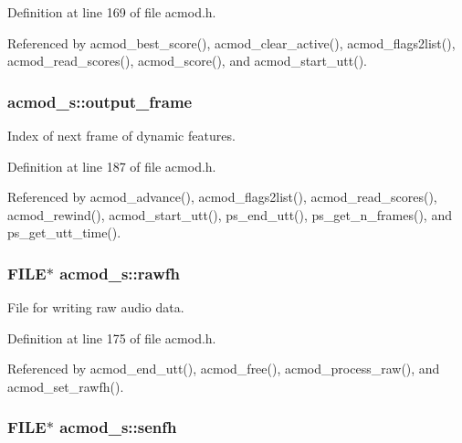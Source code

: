 Definition at line 169 of file acmod.\-h.



Referenced by acmod\-\_\-best\-\_\-score(), acmod\-\_\-clear\-\_\-active(), acmod\-\_\-flags2list(), acmod\-\_\-read\-\_\-scores(), acmod\-\_\-score(), and acmod\-\_\-start\-\_\-utt().

\subsubsection[{output\-\_\-frame}]{ acmod\-\_\-s\-::output\-\_\-frame}\label{structacmod__s_aec694af0767ac5e8f1022b6252111885}


Index of next frame of dynamic features. 



Definition at line 187 of file acmod.\-h.



Referenced by acmod\-\_\-advance(), acmod\-\_\-flags2list(), acmod\-\_\-read\-\_\-scores(), acmod\-\_\-rewind(), acmod\-\_\-start\-\_\-utt(), ps\-\_\-end\-\_\-utt(), ps\-\_\-get\-\_\-n\-\_\-frames(), and ps\-\_\-get\-\_\-utt\-\_\-time().

\subsubsection[{rawfh}]{\setlength{\rightskip}{0pt plus 5cm}F\-I\-L\-E$\ast$ acmod\-\_\-s\-::rawfh}\label{structacmod__s_aeac89442a04744ca607c4c66dab053e8}


File for writing raw audio data. 



Definition at line 175 of file acmod.\-h.



Referenced by acmod\-\_\-end\-\_\-utt(), acmod\-\_\-free(), acmod\-\_\-process\-\_\-raw(), and acmod\-\_\-set\-\_\-rawfh().

\subsubsection[{senfh}]{\setlength{\rightskip}{0pt plus 5cm}F\-I\-L\-E$\ast$ acmod\-\_\-s\-::senfh}\label{structacmod__s_aba97a9733b64074f3a4699dfbaed5ffd}


